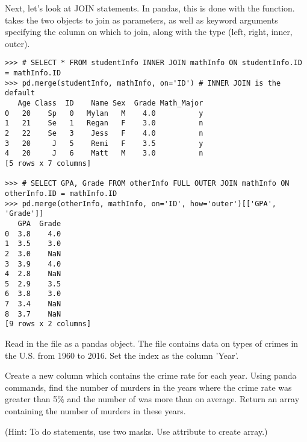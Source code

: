 \begin{comment}
\begin{problem}
Using panda commands, find the crime rates of the years where Property crimes were less than 90$\%$ of the total crime and burglary crimes were more than 20$\%$ of the total crime or property crimes were less than 90$\%$ of the total crime while violent crimes were more than 12$\%$ of the total crime.
\end{problem}
\end{comment}

Next, let's look at JOIN statements.
In pandas, this is done with the  function.
 takes the two  objects to join as parameters, as well as keyword arguments specifying
the column on which to join, along with the type (left, right, inner, outer).

\begin{lstlisting}
>>> # SELECT * FROM studentInfo INNER JOIN mathInfo ON studentInfo.ID = mathInfo.ID
>>> pd.merge(studentInfo, mathInfo, on='ID') # INNER JOIN is the default
   Age Class  ID    Name Sex  Grade Math_Major
0   20    Sp   0   Mylan   M    4.0          y
1   21    Se   1   Regan   F    3.0          n
2   22    Se   3    Jess   F    4.0          n
3   20     J   5    Remi   F    3.5          y
4   20     J   6    Matt   M    3.0          n
[5 rows x 7 columns]

>>> # SELECT GPA, Grade FROM otherInfo FULL OUTER JOIN mathInfo ON otherInfo.ID = mathInfo.ID
>>> pd.merge(otherInfo, mathInfo, on='ID', how='outer')[['GPA', 'Grade']]
   GPA  Grade
0  3.8    4.0
1  3.5    3.0
2  3.0    NaN
3  3.9    4.0
4  2.8    NaN
5  2.9    3.5
6  3.8    3.0
7  3.4    NaN
8  3.7    NaN
[9 rows x 2 columns]
\end{lstlisting}

\begin{problem}
Read in the file  as a pandas object.
The file contains data on types of crimes in the U.S. from 1960 to 2016.
Set the index as the column 'Year'.

Create a new column  which contains the crime rate for each year.
Using panda commands, find the number of murders in the years where the crime rate was greater than 5\% and the number of  was more than on average.
Return an array containing the number of murders in these years.

(Hint: To do  statements, use two masks. Use  attribute to create array.)
\label{prob:rate}
\end{problem}

